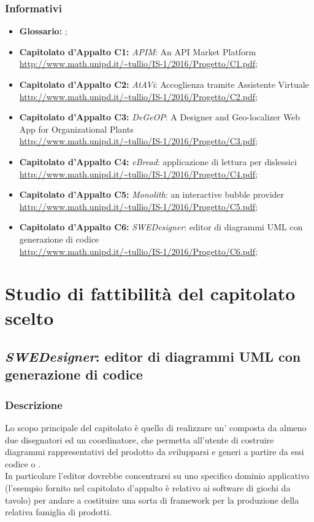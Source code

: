 		\subsubsection{Informativi}
		\begin{itemize}
			\item \textbf{Glossario: }\emph{\Glossario};
			\item \textbf{Capitolato d'Appalto C1:} \emph{APIM}: An API Market Platform
			\\ \url{http://www.math.unipd.it/~tullio/IS-1/2016/Progetto/C1.pdf};
			\item \textbf{Capitolato d'Appalto C2:} \emph{AtAVi}: Accoglienza tramite Assistente Virtuale
			\\ \url{http://www.math.unipd.it/~tullio/IS-1/2016/Progetto/C2.pdf};
			\item \textbf{Capitolato d'Appalto C3:} \emph{DeGeOP}: A Designer and Geo-localizer Web App for Organizational Plants
			\\ \url{http://www.math.unipd.it/~tullio/IS-1/2016/Progetto/C3.pdf};
			\item \textbf{Capitolato d'Appalto C4:} \emph{eBread}: applicazione di lettura per dislessici
			\\ \url{http://www.math.unipd.it/~tullio/IS-1/2016/Progetto/C4.pdf};
			\item \textbf{Capitolato d'Appalto C5:} \emph{Monolith}: an interactive bubble provider
			\\ \url{http://www.math.unipd.it/~tullio/IS-1/2016/Progetto/C5.pdf};
			\item \textbf{Capitolato d'Appalto C6:} \emph{SWEDesigner}: editor di diagrammi UML con generazione di codice
			\\ \url{http://www.math.unipd.it/~tullio/IS-1/2016/Progetto/C6.pdf};
		\end{itemize}
\newpage
	
\section{Studio di fattibilità del capitolato scelto}
	\subsection{\emph{SWEDesigner}: editor di diagrammi UML con generazione di codice}
		\subsubsection{Descrizione}
		Lo scopo principale del capitolato è quello di realizzare un' composta da almeno due disegnatori
		ed un coordinatore, che permetta all'utente di costruire diagrammi  rappresentativi del prodotto da svilupparsi e generi a partire da essi codice 
		 o .
		\\In particolare l'editor dovrebbe concentrarsi su uno specifico dominio applicativo (l'esempio fornito nel capitolato d'appalto è relativo ai software 
		di giochi da tavolo) per andare a costituire una sorta di framework per la produzione della relativa famiglia di prodotti.
		
